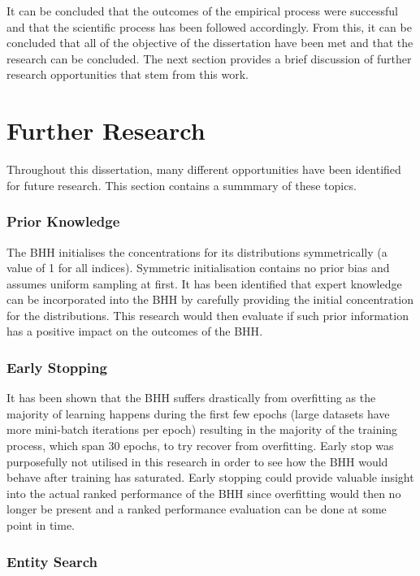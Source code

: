It can be concluded that the outcomes of the empirical process were successful and that the scientific process has been followed accordingly. From this, it can be concluded that all of the objective of the dissertation have been met and that the research can be concluded. The next section provides a brief discussion of further research opportunities that stem from this work.

\section{Further Research}
\label{sec:conclusion:further_research}

Throughout this dissertation, many different opportunities have been identified for future research. This section contains a summmary of these topics.


\subsubsection{Prior Knowledge}

The \ac{BHH} initialises the concentrations for its distributions symmetrically (a value of 1 for all indices). Symmetric initialisation contains no prior bias and assumes uniform sampling at first. It has been identified that expert knowledge can be incorporated into the \ac{BHH} by carefully providing the initial concentration for the distributions. This research would then evaluate if such prior information has a positive impact on the outcomes of the \ac{BHH}.


\subsubsection{Early Stopping}

It has been shown that the \ac{BHH} suffers drastically from overfitting as the majority of learning happens during the first few epochs (large datasets have more mini-batch iterations per epoch) resulting in the majority of the training process, which span 30 epochs, to try recover from overfitting. Early stop was purposefully not utilised in this research in order to see how the \ac{BHH} would behave after training has saturated. Early stopping could provide valuable insight into the actual ranked performance of the \ac{BHH} since overfitting would then no longer be present and a ranked performance evaluation can be done at some point in time.

\subsubsection{Entity Search}

